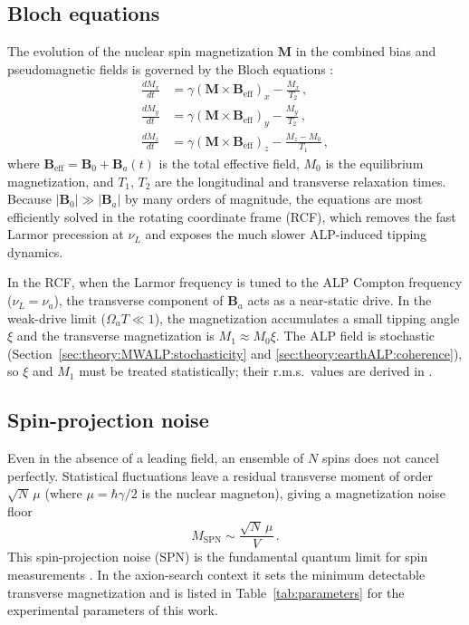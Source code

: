 \subsection{Bloch equations}\label{sec:theory:bloch}
The evolution of the nuclear spin magnetization $\mathbf{M}$ in the combined bias and pseudomagnetic fields is governed by the Bloch equations \cite{Abragam1961_NuclearMagnetism}:
\begin{align}
    \frac{dM_x}{dt} &= \gamma\left(\mathbf{M}\times\mathbf{B}_\mathrm{eff}\right)_x - \frac{M_x}{T_2}\,,\label{eq:bloch_x}\\
    \frac{dM_y}{dt} &= \gamma\left(\mathbf{M}\times\mathbf{B}_\mathrm{eff}\right)_y - \frac{M_y}{T_2}\,,\label{eq:bloch_y}\\
    \frac{dM_z}{dt} &= \gamma\left(\mathbf{M}\times\mathbf{B}_\mathrm{eff}\right)_z - \frac{M_z-M_0}{T_1}\,,\label{eq:bloch_z}
\end{align}
where $\mathbf{B}_\mathrm{eff} = \mathbf{B}_0 + \mathbf{B}_a(t)$ is the total effective field, $M_0$ is the equilibrium magnetization, and $T_1$, $T_2$ are the longitudinal and transverse relaxation times.
Because $|\mathbf{B}_0| \gg |\mathbf{B}_a|$ by many orders of magnitude, the equations are most efficiently solved in the rotating coordinate frame (RCF), which removes the fast Larmor precession at $\nu_L$ and exposes the much slower ALP-induced tipping dynamics.

In the RCF, when the Larmor frequency is tuned to the ALP Compton frequency ($\nu_L = \nu_a$), the transverse component of $\mathbf{B}_a$ acts as a near-static drive.
In the weak-drive limit ($\Omega_a T \ll 1$), the magnetization accumulates a small tipping angle $\xi$ and the transverse magnetization is $M_1 \approx M_0\xi$.
The ALP field is stochastic (Section~\ref{sec:theory:MWALP:stochasticity} and \ref{sec:theory:earthALP:coherence}), so $\xi$ and $M_1$ must be treated statistically; their r.m.s.\ values are derived in .


\subsection{Spin-projection noise}\label{sec:NMR:SPN}
Even in the absence of a leading field, an ensemble of $N$ spins does not cancel perfectly.
Statistical fluctuations leave a residual transverse moment of order $\sqrt{N}\,\mu$ (where $\mu = \hbar\gamma/2$ is the nuclear magneton), giving a magnetization noise floor
\begin{equation}
    M_\mathrm{SPN} \sim \frac{\sqrt{N}\,\mu}{V}
    \,.\label{eq:SPN}
\end{equation}
This spin-projection noise (SPN) is the fundamental quantum limit for spin measurements \cite{Mitchell2020_MagSensors}.
In the axion-search context it sets the minimum detectable transverse magnetization and is listed in Table~\ref{tab:parameters} for the experimental parameters of this work.

